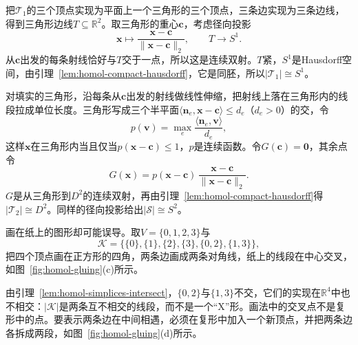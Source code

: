 \begin{example}[三角形边界是圆周]
\label{ex:homol-triangle-circle}
把$\mathcal T_1$的三个顶点实现为平面上一个三角形的三个顶点，三条边实现为三条边线，得到三角形边线$T\subseteq\mathbb R^2$。取三角形的重心$\bm c$，考虑径向投影
\[
 \bm x\mapsto\frac{\bm x-\bm c}{\lVert\bm x-\bm c\rVert_2},\qquad T\to S^1.
\]
从$\bm c$出发的每条射线恰好与$T$交于一点，所以这是连续双射。$T$紧，$S^1$是Hausdorff空间，由引理~\ref{lem:homol-compact-hausdorff}，它是同胚，所以$\lvert\mathcal T_1\rvert\cong S^1$。

对填实的三角形，沿每条从$\bm c$出发的射线做线性伸缩，把射线上落在三角形内的线段拉成单位长度。三角形写成三个半平面$\langle\bm n_e,\bm x-\bm c\rangle\leq d_e$（$d_e>0$）的交，令
\[
 p(\bm v)=\max_e\frac{\langle\bm n_e,\bm v\rangle}{d_e},
\]
这样$\bm x$在三角形内当且仅当$p(\bm x-\bm c)\leq1$，$p$是连续函数。令$G(\bm c)=\bm 0$，其余点令
\[
 G(\bm x)=p(\bm x-\bm c)\,\frac{\bm x-\bm c}{\lVert\bm x-\bm c\rVert_2}.
\]
$G$是从三角形到$D^2$的连续双射，再由引理~\ref{lem:homol-compact-hausdorff}得$\lvert\mathcal T_2\rvert\cong D^2$。同样的径向投影给出$\lvert\mathcal S\rvert\cong S^2$。
\end{example}

画在纸上的图形却可能误导。取$V=\{0,1,2,3\}$与
\[
 \mathcal K=\bigl\{\{0\},\{1\},\{2\},\{3\},\{0,2\},\{1,3\}\bigr\},
\]
把四个顶点画在正方形的四角，两条边画成两条对角线，纸上的线段在中心交叉，如图~\ref{fig:homol-gluing}(c)所示。

由引理~\ref{lem:homol-simplices-intersect}，$\{0,2\}$与$\{1,3\}$不交，它们的实现在$\mathbb R^4$中也不相交：$\lvert\mathcal K\rvert$是两条互不相交的线段，而不是一个“X”形。画法中的交叉点不是复形中的点。要表示两条边在中间相遇，必须在复形中加入一个新顶点，并把两条边各拆成两段，如图~\ref{fig:homol-gluing}(d)所示。
